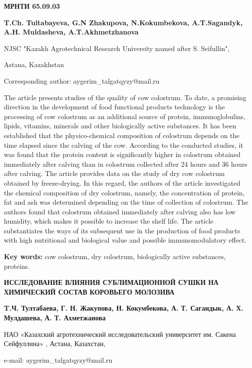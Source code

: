 \newpage
{\bfseries МРНТИ 65.09.03}


\begin{center}
{\bfseries T.Ch. Tultabayeva, G.N Zhakupova, N.Kokumbekova, A.T.Sagandyk, A.H. Muldasheva, A.T.Akhmetzhanova}

NJSC "Kazakh Agrotechnical Research University named after S.
Seifullin",

Astana, Kazakhstan

Corresponding author: aygerim\_talgatqyzy@mail.ru
\end{center}

The article presents studies of the quality of cow colostrum. To date, a
promising direction in the development of food functional products
technology is the processing of cow colostrum as an additional source of
protein, immunoglobulins, lipids, vitamins, minerals and other
biologically active substances. It has been established that the
physico-chemical composition of colostrum depends on the time elapsed
since the calving of the cow. According to the conducted studies, it was
found that the protein content is significantly higher in colostrum
obtained immediately after calving than in colostrum collected after 24
hours and 36 hours after calving. The article provides data on the study
of dry cow colostrum obtained by freeze-drying. In this regard, the
authors of the article investigated the chemical composition of dry
colostrum, namely, the concentration of protein, fat and ash was
determined depending on the time of collection of colostrum. The authors
found that colostrum obtained immediately after calving also has low
humidity, which makes it possible to increase the shelf life. The
article substantiates the ways of its subsequent use in the production
of food products with high nutritional and biological value and possible
immunomodulatory effect.

{\bfseries Key words:} cow colostrum, dry colostrum, biologically active
substances, proteins.

\begin{center}
{\large\bfseries ИССЛЕДОВАНИЕ ВЛИЯНИЯ СУБЛИМАЦИОННОЙ СУШКИ НА ХИМИЧЕСКИЙ СОСТАВ КОРОВЬЕГО МОЛОЗИВА}

{\bfseries T.Ч. Тултабаева, Г. Н. Жакупова, Н. Кокумбекова, А. Т. Сагандык, А. Х. Мулдашева, А. Т. Ахметжанова}

НАО «Казахский агротехнический исследовательский университет им. Сакена
Сейфуллина» , Астана, Казахстан,

e-mail: aygerim\_talgatqyzy@mail.ru
\end{center}

